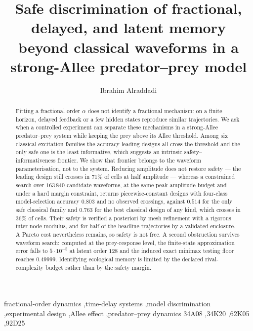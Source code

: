 \documentclass[preprint,12pt]{elsarticle}
\numberwithin{equation}{section}
\theoremstyle{plain}
\theoremstyle{definition}
\theoremstyle{remark}
\begin{document}
\begin{frontmatter}

\title{Safe discrimination of fractional, delayed, and latent memory beyond classical waveforms in a strong-Allee predator--prey model}

\author[iu]{Ibrahim Alraddadi}
\address[iu]{Department of Mathematics, Faculty of Science, Islamic University of Madinah, Madinah 42351, Saudi Arabia}

\begin{abstract}
Fitting a fractional order $\alpha$ does not identify a fractional mechanism: on a finite horizon, delayed feedback or a few hidden states reproduce similar trajectories. We ask when a controlled experiment can separate these mechanisms in a strong-Allee predator--prey system while keeping the prey above its Allee threshold. Among six classical excitation families the accuracy-leading designs all cross the threshold and the only safe one is the least informative, which suggests an intrinsic safety--informativeness frontier. We show that frontier belongs to the waveform parameterisation, not to the system. Reducing amplitude does not restore safety --- the leading design still crosses in $71\%$ of cells at half amplitude --- whereas a constrained search over $163\,840$ candidate waveforms, at the same peak-amplitude budget and under a hard margin constraint, returns piecewise-constant designs with four-class model-selection accuracy $0.803$ and no observed crossings, against $0.514$ for the only safe classical family and $0.763$ for the best classical design of any kind, which crosses in $36\%$ of cells. Their safety is verified a posteriori by mesh refinement with a rigorous inter-node modulus, and for half of the headline trajectories by a validated enclosure. A Pareto cost nevertheless remains, so safety is not free. A second obstruction survives waveform search: computed at the prey-response level, the finite-state approximation error falls to $5\cdot10^{-5}$ at latent order $128$ and the induced exact minimax testing floor reaches $0.49999$. Identifying ecological memory is limited by the declared rival-complexity budget rather than by the safety margin.
\end{abstract}

\begin{keyword}
fractional-order dynamics \sep time-delay systems \sep model discrimination \sep experimental design \sep Allee effect \sep predator--prey dynamics
\MSC[2020] 34A08 \sep 34K20 \sep 62K05 \sep 92D25
\end{keyword}

\end{frontmatter}
\end{document}
